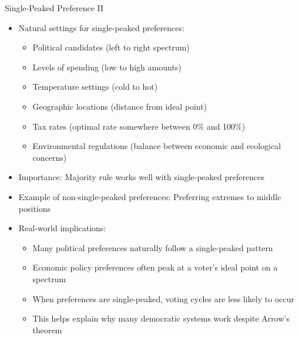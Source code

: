\documentclass[10pt,handout]{beamer}
\begin{document}
\begin{frame}{Single-Peaked Preference II}
  \begin{itemize}[<+->]
    \item Natural settings for single-peaked preferences:
      \begin{itemize}
        \item Political candidates (left to right spectrum)
        \item Levels of spending (low to high amounts)
        \item Temperature settings (cold to hot)
        \item Geographic locations (distance from ideal point)
        \item Tax rates (optimal rate somewhere between 0\% and 100\%)
        \item Environmental regulations (balance between economic and ecological concerns)
      \end{itemize}
    \item Importance: Majority rule works well with single-peaked preferences
    \item Example of non-single-peaked preferences: Preferring extremes to middle positions
    \item Real-world implications:
      \begin{itemize}
        \item Many political preferences naturally follow a single-peaked pattern
        \item Economic policy preferences often peak at a voter's ideal point on a spectrum
        \item When preferences are single-peaked, voting cycles are less likely to occur
        \item This helps explain why many democratic systems work despite Arrow's theorem
      \end{itemize}
  \end{itemize}
\end{frame}
\end{document}
